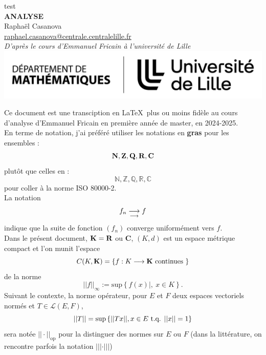 \documentclass[a4paper,11pt, twoside]{article}
\title{}
\author{Raphaël Casanova}
\begin{document}
\pagestyle{empty}
\begin{center}
{\color{white} test}\\
\vspace{5cm}
{\bf \Huge {\YUGE A}NALYSE}\\[1em]
Raphaël Casanova\\
\href{mailto:raphael.casanova@centrale.centralelille.fr}{raphael.casanova@centrale.centralelille.fr}\\[2em]
\emph{D'après le cours d'Emmanuel Fricain à l'université de Lille}\\
\vspace{10cm}
\includegraphics[width=1\textwidth]{lille.pdf}
\end{center}


\newpage


\pagestyle{pageGarde}


\tableofcontents


\newpage


Ce document est une transciption en \LaTeX\ plus ou moins fidèle au cours d'analyse d'Emmanuel Fricain en première année de master, en 2024-2025.\\
En terme de notation, j'ai préféré utiliser les notations en {\bf gras} pour les ensembles : 
$$\mathbf N,\mathbf Z,\mathbf Q,\mathbf R,\mathbf C$$ plutôt que celles en : $$\mathbb N,\mathbb Z, \mathbb Q,\mathbb R,\mathbb C$$ pour coller à la norme ISO 80000-2.\\
La notation 
$$f_n\underset{\longrightarrow}{\longrightarrow} f$$
indique que la suite de fonction $\left(f_n\right)$ converge uniformément vers $f$.\\
Dans le présent document, $\mathbf K=\mathbf R$ ou $\mathbf C$, $(K,d)$ est un espace métrique compact et l'on munit l'espace 
$$C(K,\mathbf K)=\left\{f:K\longrightarrow\mathbf K\text{ continues }\right\}$$
de la norme 
$$||f||_{\infty}:=\mathrm{sup}\left\{f(x)|,\ x\in K\right\}.$$
Suivant le contexte, la norme opérateur, pour $E$ et $F$ deux espaces vectoriels normés et $T\in\mathcal L(E,F)$,
$$||T||=\mathrm{sup}\left\{||T x||, x\in E\text{ t.q. }||x||=1\right\}$$
sera notée $||\cdot||_{\mathrm{op}}$ pour la distinguer des normes sur $E$ ou $F$ (dans la littérature, on rencontre parfois la notation $|||\cdot|||$)




\pagestyle{TestPage}
\end{document}

